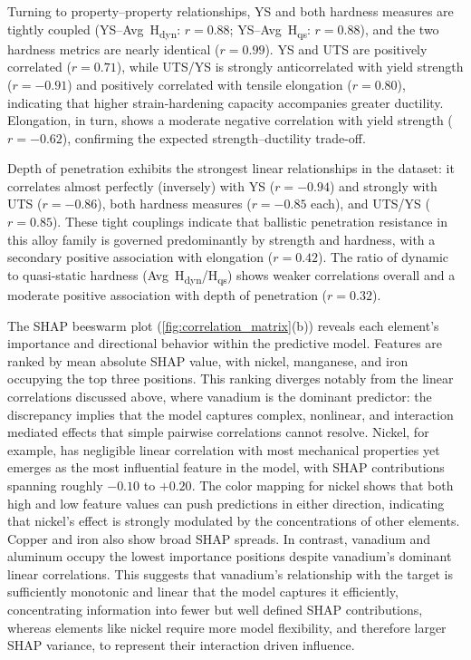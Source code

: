 Turning to property--property relationships, YS and both hardness measures are tightly coupled (YS--Avg~H\textsubscript{dyn}: $r = 0.88$; YS--Avg~H\textsubscript{qs}: $r = 0.88$), and the two hardness metrics are nearly identical ($r = 0.99$). YS and UTS are positively correlated ($r = 0.71$), while UTS/YS is strongly anticorrelated with yield strength ($r = -0.91$) and positively correlated with tensile elongation ($r = 0.80$), indicating that higher strain-hardening capacity accompanies greater ductility. Elongation, in turn, shows a moderate negative correlation with yield strength ($r = -0.62$), confirming the expected strength--ductility trade-off.

Depth of penetration exhibits the strongest linear relationships in the dataset: it correlates almost perfectly (inversely) with YS ($r = -0.94$) and strongly with UTS ($r = -0.86$), both hardness measures ($r = -0.85$ each), and UTS/YS ($r = 0.85$). These tight couplings indicate that ballistic penetration resistance in this alloy family is governed predominantly by strength and hardness, with a secondary positive association with elongation ($r = 0.42$). The ratio of dynamic to quasi-static hardness (Avg~H\textsubscript{dyn}/H\textsubscript{qs}) shows weaker correlations overall and a moderate positive association with depth of penetration ($r = 0.32$).

The SHAP beeswarm plot (\autoref{fig:correlation_matrix}(b)) reveals each element's importance and directional behavior within the predictive model. Features are ranked by mean absolute SHAP value, with nickel, manganese, and iron occupying the top three positions. This ranking diverges notably from the linear correlations discussed above, where vanadium is the dominant predictor: the discrepancy implies that the model captures complex, nonlinear, and interaction mediated effects that simple pairwise correlations cannot resolve. Nickel, for example, has negligible linear correlation with most mechanical properties yet emerges as the most influential feature in the model, with SHAP contributions spanning roughly $-0.10$ to $+0.20$. The color mapping for nickel shows that both high and low feature values can push predictions in either direction, indicating that nickel's effect is strongly modulated by the concentrations of other elements. Copper and iron also show broad SHAP spreads. In contrast, vanadium and aluminum occupy the lowest importance positions despite vanadium's dominant linear correlations. This suggests that vanadium's relationship with the target is sufficiently monotonic and linear that the model captures it efficiently, concentrating information into fewer but well defined SHAP contributions, whereas elements like nickel require more model flexibility, and therefore larger SHAP variance, to represent their interaction driven influence.

